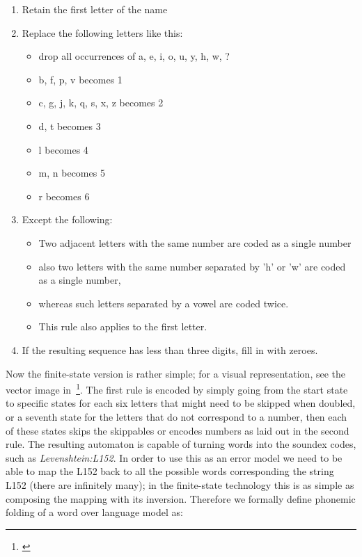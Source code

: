 \documentclass[a4paper,12pt]{article}
\begin{document}
\begin{enumerate}
    \item Retain the first letter of the name 
    \item Replace the following letters like this:\begin{itemize}
            \item drop all occurrences of a, e, i, o, u, y, h, w, ?
            \item b, f, p, v becomes 1
            \item c, g, j, k, q, s, x, z becomes 2
            \item d, t becomes 3
            \item l becomes 4
            \item m, n becomes 5
            \item r becomes 6
        \end{itemize}
    \item Except the following:\begin{itemize}
            \item Two adjacent letters with the same number are coded as a
                single number
            \item also two letters with the same number separated by 'h' or 'w'
                are coded as a single number,
            \item whereas such letters separated by a vowel are coded twice.
            \item This rule also applies to the first letter.
        \end{itemize}
    \item If the resulting sequence has less than three digits, fill in with
        zeroes.
\end{enumerate}

Now the finite-state version is rather simple; for a visual representation, 
see the vector image in~\footnote{\url{}}. The first rule is encoded by
simply going from the start state to specific states for each six letters that
might need to be skipped when doubled, or a seventh state for the letters that
do not correspond to a number, then each of these states skips the skippables
or encodes numbers as laid out in the second rule. The resulting automaton is
capable of turning words into the soundex codes, such as
\emph{Levenshtein:L152}. In order to use this as an error model we need to be
able to map the L152 back to all the possible words corresponding the string
L152 (there are infinitely many); in the finite-state technology this is as
simple as composing the mapping with its inversion. Therefore we formally
define phonemic folding of a word over language model as:
\end{document}
